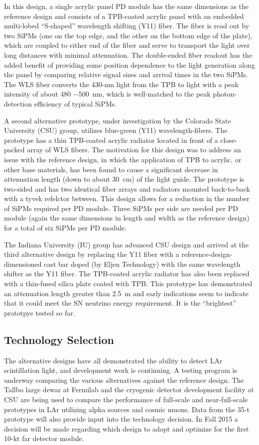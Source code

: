 In this design, a single acrylic panel PD module has the same
dimensions as the reference design and consists of a TPB-coated
acrylic panel with an embedded multi-lobed ``S-shaped'' wavelength
shifting (Y11) fiber. The fiber is read out by two SiPMs (one on the
top edge, and the other on the bottom edge of the plate), which are
coupled to either end of the fiber and serve to transport the light
over long distances with minimal attenuation. The double-ended fiber
readout has the added benefit of providing some position dependence to
the light generation along the panel by comparing relative signal
sizes and arrival times in the two SiPMs. The WLS fiber converts the
430-nm light from the TPB to light with a peak intensity of about 480
$-$500~nm, which is well-matched to the peak photon-detection
efficiency of typical SiPMs.

A second alternative prototype, under investigation by the Colorado
State University (CSU) group, utilizes blue-green (Y11)
wavelength-fibers. The prototype has a thin TPB-coated acrylic
radiator located in front of a close-packed array of WLS fibers. The
motivation for this design was to address an issue with the reference
design, in which the application of TPB to acrylic, or other base
materials, has been found to cause a significant decrease in
attenuation length (down to about 30~cm) of the light guide. The
prototype is two-sided and has two identical fiber arrays and
radiators mounted back-to-back with a tyvek refelctor between. This
design allows for a reduction in the number of SiPMs required per PD
module. Three SiPMs per side are needed per PD module (again the same
dimensions in length and width as the reference design) for a total of
six SiPMs per PD module.

The Indiana University (IU) group has advanced CSU design and arrived
at the third alternative design by replacing the Y11 fiber with a
reference-design-dimensioned cast bar doped (by Eljen Technology) with
the same wavelength shifter as the Y11 fiber. The TPB-coated acrylic
radiator has also been replaced with a thin-fused silica plate coated
with TPB. This prototype has demonstrated an attenuation length
greater than 2.5~m and early indications seem to indicate that it
could meet the SN neutrino energy requirement. It is the ``brightest''
prototpye tested so far.

\subsection{Technology Selection}

The alternative designs have all demonstrated the ability to detect
LAr scintillation light, and development work is continuing. A testing
program is underway comparing the various alternatives against the
reference design.  The Tallbo large dewar at Fermilab and the
cryogenic detector development facility at CSU are being used to
compare the performance of full-scale and near-full-scale prototypes
in LAr utilizing alpha sources and cosmic muons. Data from the 35-t
prototype will also provide input into the technology decision. In
Fall 2015 a decision will be made regarding which design to adopt and
optimize for the first 10-kt far detector module.
